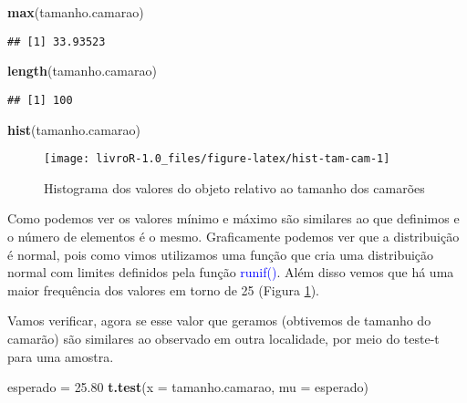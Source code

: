\documentclass[14pt,titlepage, oneside, openany, a4paper]{book}
\newenvironment{Shaded}{\begin{snugshade}}{\end{snugshade}}
\newcommand{\DataTypeTok}[1]{\textcolor[rgb]{0.13,0.29,0.53}{#1}}
\newcommand{\FloatTok}[1]{\textcolor[rgb]{0.00,0.00,0.81}{#1}}
\newcommand{\KeywordTok}[1]{\textcolor[rgb]{0.13,0.29,0.53}{\textbf{#1}}}
\newcommand{\NormalTok}[1]{#1}
\newcommand{\StringTok}[1]{\textcolor[rgb]{0.31,0.60,0.02}{#1}}
\begin{document}
\begin{Shaded}
\begin{Highlighting}[]
\KeywordTok{max}\NormalTok{(tamanho.camarao)}
\end{Highlighting}
\end{Shaded}

\begin{verbatim}
## [1] 33.93523
\end{verbatim}

\begin{Shaded}
\begin{Highlighting}[]
\KeywordTok{length}\NormalTok{(tamanho.camarao)}
\end{Highlighting}
\end{Shaded}

\begin{verbatim}
## [1] 100
\end{verbatim}

\begin{Shaded}
\begin{Highlighting}[]
\KeywordTok{hist}\NormalTok{(tamanho.camarao)}
\end{Highlighting}
\end{Shaded}

\begin{figure}[H]
\texttt{[image: livroR-1.0\_files/figure-latex/hist-tam-cam-1]} \caption{Histograma dos valores do objeto relativo ao tamanho dos camarões}\label{fig:hist-tam-cam}
\end{figure}

Como podemos ver os valores mínimo e máximo são similares ao que definimos e o número de elementos é o mesmo. Graficamente podemos ver que a distribuição é normal, pois como vimos utilizamos uma função que cria uma distribuição normal com limites definidos pela função \textcolor{blue}{runif()}. Além disso vemos que há uma maior frequência dos valores em torno de 25 (Figura \ref{fig:hist-tam-cam}).

Vamos verificar, agora se esse valor que geramos (obtivemos de tamanho do camarão) são similares ao observado em outra localidade, por meio do teste-t para uma amostra.

\begin{Shaded}
\begin{Highlighting}[]
\NormalTok{esperado =}\StringTok{ }\FloatTok{25.80}
\KeywordTok{t.test}\NormalTok{(}\DataTypeTok{x =}\NormalTok{ tamanho.camarao, }\DataTypeTok{mu =}\NormalTok{ esperado)}
\end{Highlighting}
\end{Shaded}
\end{document}
